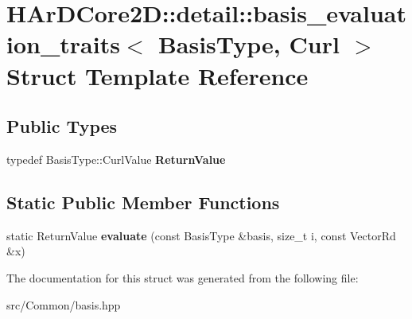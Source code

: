 \hypertarget{structHArDCore2D_1_1detail_1_1basis__evaluation__traits_3_01BasisType_00_01Curl_01_4}{}\section{H\+Ar\+D\+Core2D\+:\+:detail\+:\+:basis\+\_\+evaluation\+\_\+traits$<$ Basis\+Type, Curl $>$ Struct Template Reference}
\label{structHArDCore2D_1_1detail_1_1basis__evaluation__traits_3_01BasisType_00_01Curl_01_4}
\subsection*{Public Types}
\begin{DoxyCompactItemize}
\item 
\mbox{\label{structHArDCore2D_1_1detail_1_1basis__evaluation__traits_3_01BasisType_00_01Curl_01_4_a80ce0c225d00d0530e83daa716962e26}} 
typedef Basis\+Type\+::\+Curl\+Value {\bfseries Return\+Value}
\end{DoxyCompactItemize}
\subsection*{Static Public Member Functions}
\begin{DoxyCompactItemize}
\item 
\mbox{\label{structHArDCore2D_1_1detail_1_1basis__evaluation__traits_3_01BasisType_00_01Curl_01_4_aa8e4677d16945866dc5ffc6d77de750e}} 
static Return\+Value {\bfseries evaluate} (const Basis\+Type \&basis, size\+\_\+t i, const Vector\+Rd \&x)
\end{DoxyCompactItemize}


The documentation for this struct was generated from the following file\+:\begin{DoxyCompactItemize}
\item 
src/\+Common/basis.\+hpp\end{DoxyCompactItemize}
